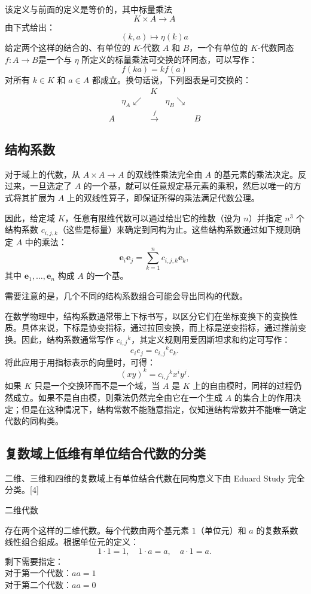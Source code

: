 该定义与前面的定义是等价的，其中标量乘法
$$
K \times A \to A~
$$
由下式给出：
$$
(k, a) \mapsto \eta(k)a~
$$
给定两个这样的结合的、有单位的 $K$-代数 $A$ 和 $B$，一个有单位的 $K$-代数同态$f : A \to B$是一个与 $\eta$ 所定义的标量乘法可交换的环同态，可以写作：
$$
f(ka) = k f(a)~
$$
对所有 $k \in K$ 和 $a \in A$ 都成立。换句话说，下列图表是可交换的：
$$
\begin{matrix}
& & K & & \\
& \eta_A \swarrow & & \eta_B \searrow & \\
A & & \xrightarrow{f} & & B
\end{matrix}~
$$
\subsection{结构系数}
对于域上的代数，从 $A \times A \to A$ 的双线性乘法完全由 $A$ 的基元素的乘法决定。反过来，一旦选定了 $A$ 的一个基，就可以任意规定基元素的乘积，然后以唯一的方式将其扩展为 $A$ 上的双线性算子，即保证所得的乘法满足代数公理。

因此，给定域 $K$，任意有限维代数可以通过给出它的维数（设为 $n$）并指定 $n^3$ 个结构系数 $c_{i,j,k}$（这些是标量）来确定到同构为止。这些结构系数通过如下规则确定 $A$ 中的乘法：
$$
\mathbf{e}_i \mathbf{e}_j = \sum_{k=1}^{n} c_{i,j,k} \mathbf{e}_k,~
$$
其中 $\mathbf{e}_1, \ldots, \mathbf{e}_n$ 构成 $A$ 的一个基。

需要注意的是，几个不同的结构系数组合可能会导出同构的代数。

在数学物理中，结构系数通常带上下标书写，以区分它们在坐标变换下的变换性质。具体来说，下标是协变指标，通过拉回变换，而上标是逆变指标，通过推前变换。因此，结构系数通常写作 $c_{i,j}{}^{k}$，其定义规则用爱因斯坦求和约定可写作：
$$
e_i e_j = c_{i,j}{}^{k} e_k.~
$$
将此应用于用指标表示的向量时，可得：
$$
(xy)^k = c_{i,j}{}^{k} x^i y^j.~
$$
如果 $K$ 只是一个交换环而不是一个域，当 $A$ 是 $K$ 上的自由模时，同样的过程仍然成立。如果不是自由模，则乘法仍然完全由它在一个生成 $A$ 的集合上的作用决定；但是在这种情况下，结构常数不能随意指定，仅知道结构常数并不能唯一确定代数的同构类。
\subsection{复数域上低维有单位结合代数的分类}
二维、三维和四维的复数域上有单位结合代数在同构意义下由 Eduard Study 完全分类。[4]

二维代数

存在两个这样的二维代数。每个代数由两个基元素 $1$（单位元）和 $a$ 的复数系数线性组合组成。根据单位元的定义：
$$
1 \cdot 1 = 1, \quad 1 \cdot a = a, \quad a \cdot 1 = a.~
$$
剩下需要指定：\\
对于第一个代数：$a a = 1$\\
对于第二个代数：$a a = 0$

